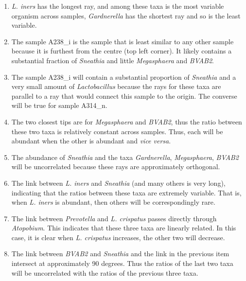 \documentclass[11pt]{article}\usepackage[]{graphicx}\usepackage[]{color}
\begin{document}
\begin{enumerate}
\item \emph{L. iners} has the longest ray, and among these taxa is the most variable organism across samples, \emph{Gardnerella} has the shortest ray and so is the least variable.

\item The sample A238\_i is the sample that is least similar to any other sample because it is furthest from the centre (top left corner). It likely contains a substantial fraction of \emph{Sneathia} and little \emph{Megasphaera} and \emph{BVAB2}.

\item The sample A238\_i will contain a substantial proportion of \emph{Sneathia} and a very small amount of \emph{Lactobacillus} because the rays for these taxa are parallel to a ray that would connect this sample to the origin. The converse will be true for sample A314\_n. 

\item The two closest tips are for \emph{Megasphaera} and \emph{BVAB2}, thus the ratio between these two taxa is relatively constant across samples. Thus, each will be abundant when the other is abundant and \emph{vice versa}.

\item The abundance of \emph{Sneathia} and the taxa \emph{Gardnerella}, \emph{Megasphaera}, \emph{BVAB2} will be uncorrelated because these rays are approximately orthogonal.

\item The link between \emph{L. iners} and \emph{Sneathia} (and many others is very long), indicating that the ratios between these taxa are extremely variable. That is, when \emph{L. iners} is abundant, then others will be correspondingly rare.

\item The link between \emph{Prevotella} and \emph{L. crispatus} passes directly through \emph{Atopobium}. This indicates that these three taxa are linearly related. In this case, it is clear when \emph{L. crispatus} increases, the other two will decrease. 

\item The link between \emph{BVAB2} and \emph{Sneathia} and the link in the previous item intersect at approximately 90 degrees. Thus the ratios of the last two taxa will be uncorrelated with the ratios of the previous three taxa.

\end{enumerate}
\end{document}

